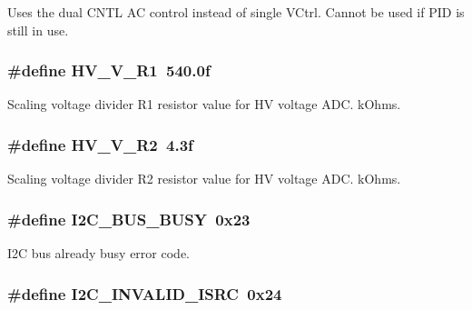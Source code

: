 Uses the dual C\-N\-T\-L A\-C control instead of single V\-Ctrl. Cannot be used if P\-I\-D is still in use. \hypertarget{a00043_ab52968d537ec947fa219a56171653253}{
\subsubsection[{H\-V\-\_\-\-V\-\_\-\-R1}]{\setlength{\rightskip}{0pt plus 5cm}\#define H\-V\-\_\-\-V\-\_\-\-R1~540.\-0f}}\label{a00043_ab52968d537ec947fa219a56171653253}
Scaling voltage divider R1 resistor value for H\-V voltage A\-D\-C. k\-Ohms. \hypertarget{a00043_a8569aeeace91f4d7ca9e68fa24d5a8f2}{
\subsubsection[{H\-V\-\_\-\-V\-\_\-\-R2}]{\setlength{\rightskip}{0pt plus 5cm}\#define H\-V\-\_\-\-V\-\_\-\-R2~4.\-3f}}\label{a00043_a8569aeeace91f4d7ca9e68fa24d5a8f2}
Scaling voltage divider R2 resistor value for H\-V voltage A\-D\-C. k\-Ohms. \hypertarget{a00043_ad3082827214b064d5b8289acaeb9ad20}{
\subsubsection[{I2\-C\-\_\-\-B\-U\-S\-\_\-\-B\-U\-S\-Y}]{\setlength{\rightskip}{0pt plus 5cm}\#define I2\-C\-\_\-\-B\-U\-S\-\_\-\-B\-U\-S\-Y~0x23}}\label{a00043_ad3082827214b064d5b8289acaeb9ad20}
I2\-C bus already busy error code. \hypertarget{a00043_a8e605ae1b9fc359d203b90cb9f8a090e}{
\subsubsection[{I2\-C\-\_\-\-I\-N\-V\-A\-L\-I\-D\-\_\-\-I\-S\-R\-C}]{\setlength{\rightskip}{0pt plus 5cm}\#define I2\-C\-\_\-\-I\-N\-V\-A\-L\-I\-D\-\_\-\-I\-S\-R\-C~0x24}}\label{a00043_a8e605ae1b9fc359d203b90cb9f8a090e}
